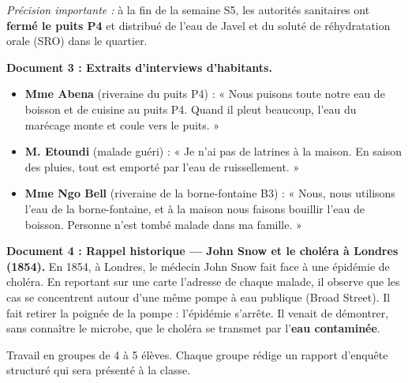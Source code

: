 \documentclass[11pt]{article}
\newcounter{popsec}
\newcounter{popsub}
\newcommand{\courssub}[1]{%
  \stepcounter{popsub}%
  \par\vspace{9pt}\noindent{\popxbold\fontsize{11.5}{13}\selectfont\color{popink}{\color{poporange}\thepopsec.\thepopsub}\hspace{6pt}#1}\par\nopagebreak\vspace{4pt}
}
\begin{document}
\emph{Précision importante :} à la fin de la semaine S5, les autorités sanitaires ont \textbf{fermé le puits P4} et distribué de l'eau de Javel et du soluté de réhydratation orale (SRO) dans le quartier.

\textbf{Document 3 : Extraits d'interviews d'habitants.}
\begin{itemize}
\item \textbf{Mme Abena} (riveraine du puits P4) : « Nous puisons toute notre eau de boisson et de cuisine au puits P4. Quand il pleut beaucoup, l'eau du marécage monte et coule vers le puits. »
\item \textbf{M. Etoundi} (malade guéri) : « Je n'ai pas de latrines à la maison. En saison des pluies, tout est emporté par l'eau de ruissellement. »
\item \textbf{Mme Ngo Bell} (riveraine de la borne-fontaine B3) : « Nous, nous utilisons l'eau de la borne-fontaine, et à la maison nous faisons bouillir l'eau de boisson. Personne n'est tombé malade dans ma famille. »
\end{itemize}

\textbf{Document 4 : Rappel historique — John Snow et le choléra à Londres (1854).}
En 1854, à Londres, le médecin John Snow fait face à une épidémie de choléra. En reportant sur une carte l'adresse de chaque malade, il observe que les cas se concentrent autour d'une même pompe à eau publique (Broad Street). Il fait retirer la poignée de la pompe : l'épidémie s'arrête. Il venait de démontrer, sans connaître le microbe, que le choléra se transmet par l'\textbf{eau contaminée}.

\courssub{Consignes}

Travail en groupes de 4 à 5 élèves. Chaque groupe rédige un rapport d'enquête structuré qui sera présenté à la classe.
\end{document}
